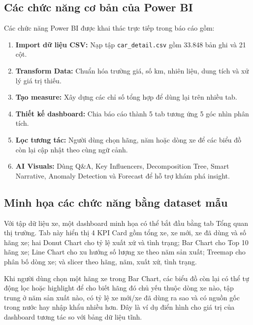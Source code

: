 \subsection{Các chức năng cơ bản của Power BI}

Các chức năng Power BI được khai thác trực tiếp trong báo cáo gồm:

\begin{enumerate}
    \item \textbf{Import dữ liệu CSV:} Nạp tập \texttt{car\_detail.csv} gồm 33.848 bản ghi và 21 cột.
    \item \textbf{Transform Data:} Chuẩn hóa trường giá, số km, nhiên liệu, dung tích và xử lý giá trị thiếu.
    \item \textbf{Tạo measure:} Xây dựng các chỉ số tổng hợp để dùng lại trên nhiều tab.
    \item \textbf{Thiết kế dashboard:} Chia báo cáo thành 5 tab tương ứng 5 góc nhìn phân tích.
    \item \textbf{Lọc tương tác:} Người dùng chọn hãng, năm hoặc dòng xe để các biểu đồ còn lại cập nhật theo cùng ngữ cảnh.
    \item \textbf{AI Visuals:} Dùng Q\&A, Key Influencers, Decomposition Tree, Smart Narrative, Anomaly Detection và Forecast để hỗ trợ khám phá insight.
\end{enumerate}

\subsection{Minh họa các chức năng bằng dataset mẫu}

Với tập dữ liệu xe, một dashboard minh họa có thể bắt đầu bằng tab Tổng quan thị trường. Tab này hiển thị 4 KPI Card gồm tổng xe, xe mới, xe đã dùng và số hãng xe; hai Donut Chart cho tỷ lệ xuất xứ và tình trạng; Bar Chart cho Top 10 hãng xe; Line Chart cho xu hướng số lượng xe theo năm sản xuất; Treemap cho phân bố dòng xe; và slicer theo hãng, năm, xuất xứ, tình trạng.

Khi người dùng chọn một hãng xe trong Bar Chart, các biểu đồ còn lại có thể tự động lọc hoặc highlight để cho biết hãng đó chủ yếu thuộc dòng xe nào, tập trung ở năm sản xuất nào, có tỷ lệ xe mới/xe đã dùng ra sao và có nguồn gốc trong nước hay nhập khẩu nhiều hơn. Đây là ví dụ điển hình cho giá trị của dashboard tương tác so với bảng dữ liệu tĩnh.

\clearpage